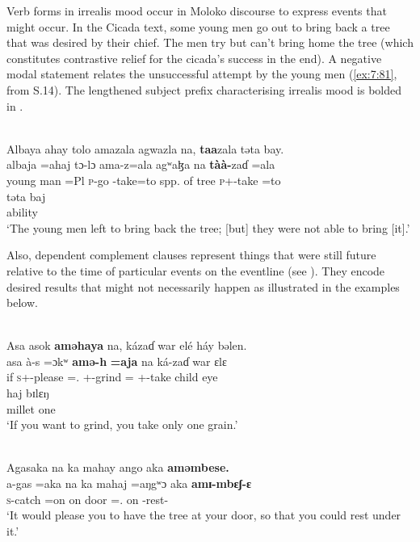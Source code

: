 Verb forms in irrealis mood occur in Moloko discourse to express events that might occur. In the Cicada text, some young men go out to bring back a tree that was desired by their chief. The men try but can’t bring home the tree (which constitutes contrastive relief for the cicada’s success in the end).  A negative modal statement relates the unsuccessful attempt by the young men (\ref{ex:7:81}, from S.14). The lengthened subject prefix characterising irrealis mood is bolded in . 

\clearpage
\ea\label{ex:7:81}\\
Albaya  ahay  tolo  amazala  agwazla  na,  \textbf{taa}zala  təta  bay.\\
\gll  albaja        =ahaj  tɔ-lɔ     ama-z=ala   agʷaɮa        na  \textbf{tàà-}zaɗ =ala \\   
      {young man}     =Pl       \textsc{p}-go  {\DEP}-take=to  {spp. of tree}  {\PSP}  \textsc{p}+{\HOR}-take =to \\ 
      
      \medskip
\gll təta  baj\\
     ability  {\NEG}\\
\glt  ‘The young men left to bring back the tree; [but] they were not able to bring [it].’\\
\z 

Also, dependent complement clauses represent things that were still future relative to the time of particular events on the eventline (see ). They encode desired results that might not necessarily happen as illustrated in the examples below. 

\ea\label{ex:7:82}\\
Asa  asok  \textbf{aməhaya}  na,  kázaɗ  war  elé  háy  bəlen.\\
\gll  asa  à-s =ɔkʷ  \textbf{amə-h} \textbf{=aja} na  ká-zaɗ war ɛlɛ\\ 
      if \textsc{s}+{\PFV}-please ={\twoS}.{\IO} {\DEP}+{\PFV}-grind ={\PLU} {\PSP} {\twoS}+{\IFV}-take child eye\\ 
      
\medskip
\gll haj bɪlɛŋ\\
     millet  one\\
\glt  ‘If you want to grind, you take only one grain.’\\
\z


\ea\label{ex:7:83}\\
Agasaka  na  ka  mahay  ango  aka  \textbf{aməmbese.}\\
\gll  a-gas  =aka      na  ka    mahaj  =aŋgʷɔ         aka  \textbf{amɪ-mbɛʃ-ɛ}\\
      \textsc{s}-catch   =on             {\PSP}  on    door        ={\twoS}.{\POSS}  on  {\DEP}-rest{}-{\CL}\\
\glt  ‘It would please you to have the tree at your door, so that you could rest under it.’ \\
\z 
{}
